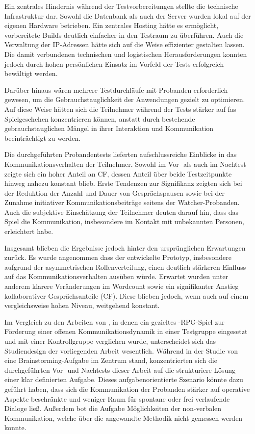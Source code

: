 Ein zentrales Hindernis während der Testvorbereitungen stellte die technische Infrastruktur dar. Sowohl die Datenbank als auch der Server wurden lokal auf der eigenen Hardware betrieben. Ein zentrales Hosting hätte es ermöglicht, vorbereitete Builds deutlich einfacher in den Testraum zu überführen. Auch die Verwaltung der IP-Adressen hätte sich auf die Weise effizienter gestalten lassen. Die damit verbundenen technischen und logistischen Herausforderungen konnten jedoch durch hohen persönlichen Einsatz im Vorfeld der Tests erfolgreich bewältigt werden.

Darüber hinaus wären mehrere Testdurchläufe mit Probanden erforderlich gewesen, um die Gebrauchstauglichkeit der Anwendungen gezielt zu optimieren. Auf diese Weise hätten sich die Teilnehmer während der Tests stärker auf fas Spielgeschehen konzentrieren können, anstatt durch bestehende gebrauchstauglichen Mängel in ihrer Interaktion und Kommunikation beeinträchtigt zu werden.

Die durchgeführten Probandentests lieferten aufschlussreiche Einblicke in das Kommunikationsverhalten der Teilnehmer. Sowohl im Vor- als auch im Nachtest zeigte sich ein hoher Anteil an \ac{CF}, dessen Anteil über beide Testzeitpunkte hinweg nahezu konstant blieb. Erste Tendenzen zur Signifikanz zeigten sich bei der Reduktion der Anzahl und Dauer von Gesprächspausen sowie bei der Zunahme initiativer Kommunikationsbeiträge seitens der Watcher-Probanden. Auch die subjektive Einschätzung der Teilnehmer deuten darauf hin, dass das Spiel die Kommunikation, insbesondere im Kontakt mit unbekannten Personen, erleichtert habe.

Insgesamt blieben die Ergebnisse jedoch hinter den ursprünglichen Erwartungen zurück. Es wurde angenommen dass der entwickelte Prototyp, insbesondere aufgrund der asymmetrischen Rollenverteilung, einen deutlich stärkeren Einfluss auf das Kommunikationsverhalten ausüben würde. Erwartet wurden unter anderem klarere Veränderungen im Wordcount sowie ein signifikanter Anstieg kollaborativer Gesprächsanteile (\ac{CF}). Diese blieben jedoch, wenn auch auf einem vergleichsweise hohen Niveau, weitgehend konstant.

Im Vergleich zu den Arbeiten von \citeauthor{nasir_effect_2015}, in denen ein gezieltes -\ac{RPG}-Spiel zur Förderung einer offenen Kommunikationsdynamik in einer Testgruppe eingesetzt und mit einer Kontrollgruppe verglichen wurde, unterscheidet sich das Studiendesign der vorliegenden Arbeit wesentlich. Während in der Studie von \citeauthor{nasir_effect_2015} eine Brainstorming-Aufgabe im Zentrum stand, konzentrierten sich die durchgeführten Vor- und Nachtests dieser Arbeit auf die strukturiere Lösung einer klar definierten Aufgabe. Dieses aufgabenorientierte Szenario könnte dazu geführt haben, dass sich die Kommunikation der Probanden stärker auf operative Aspekte beschränkte und weniger Raum für spontane oder frei verlaufende Dialoge ließ. Außerdem bot die Aufgabe Möglichkeiten der non-verbalen Kommunikation, welche über die angewandte Methodik nicht gemessen werden konnte.

